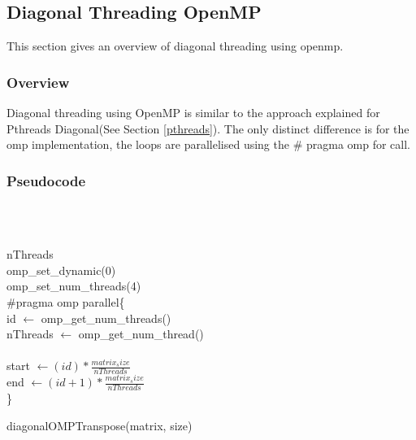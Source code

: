\documentclass[12pt, a4paper, fleqn, titlepage]{article}
\begin{document}
    \subsection{Diagonal Threading OpenMP}
        This section gives an overview of diagonal threading using openmp.
        \subsubsection{Overview}
            Diagonal threading using OpenMP is similar to the approach explained for Pthreads Diagonal(See Section \ref{pthreads}). The only distinct difference is for the omp implementation, the loops are parallelised using the \# pragma omp for call.
        \subsubsection{Pseudocode}
            \begin{algorithm}[H]
                \\
                \\
                \linebreak

                 nThreads\\
                 omp\_set\_dynamic(0) \quad {} \\
                 omp\_set\_num\_threads(4) \quad {}\\
            \#pragma omp parallel\{ \\
                \quad id $\leftarrow$ omp\_get\_num\_threads()\\
                
                \quad nThreads $\leftarrow$ omp\_get\_num\_thread()\\
                
                
                \quad {}\\

                \quad start $\leftarrow (id) * \frac{matrix_size}{nThreads}$ \\
                \quad end $\leftarrow (id+1) * \frac{matrix_size}{nThreads}$\\
                \quad {}
            \}
                
                \begin{flushleft}
                    \caption{diagonalOMPTranspose(matrix, size)
                    }
                \end{flushleft}
            \end{algorithm}
        
\end{document}
